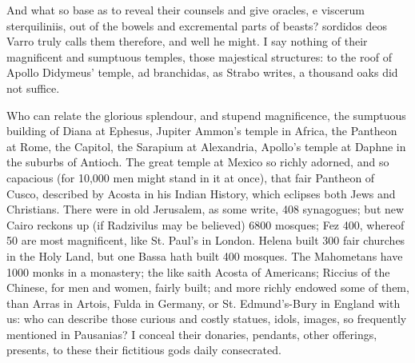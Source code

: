 {And what so base as to reveal their counsels and give oracles, e
viscerum sterquiliniis, out of the bowels and excremental parts of
beasts? sordidos deos Varro truly calls them therefore, and well he
might. I say nothing of their magnificent and sumptuous temples, those
majestical structures: to the roof of Apollo Didymeus' temple, ad
branchidas, as Strabo writes, a thousand oaks did not suffice.

Who can relate the glorious splendour, and stupend magnificence, the
sumptuous building of Diana at Ephesus, Jupiter Ammon's temple in
Africa, the Pantheon at Rome, the Capitol, the Sarapium at Alexandria,
Apollo's temple at Daphne in the suburbs of Antioch. The great temple
at Mexico so richly adorned, and so capacious (for 10,000 men might
stand in it at once), that fair Pantheon of Cusco, described by Acosta
in his Indian History, which eclipses both Jews and Christians. There
were in old Jerusalem, as some write, 408 synagogues; but new Cairo
reckons up (if Radzivilus may be believed) 6800 mosques; Fez 400,
whereof 50 are most magnificent, like St. Paul's in London. Helena
built 300 fair churches in the Holy Land, but one Bassa hath built 400
mosques. The Mahometans have 1000 monks in a monastery; the like saith
Acosta of Americans; Riccius of the Chinese, for men and women, fairly
built; and more richly endowed some of them, than Arras in Artois,
Fulda in Germany, or St. Edmund's-Bury in England with us: who can
describe those curious and costly statues, idols, images, so frequently
mentioned in Pausanias? I conceal their donaries, pendants, other
offerings, presents, to these their fictitious gods daily consecrated.

}
